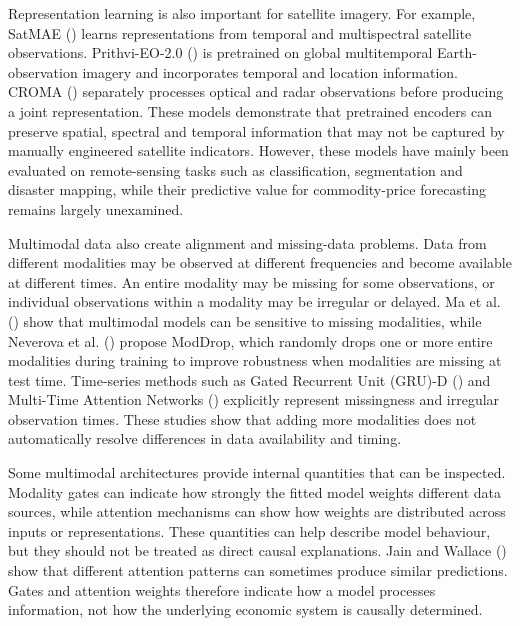 \documentclass[
  british,
  12pt,
  oneside]{book}
\begin{document}
Representation learning is also important for satellite imagery. For example, SatMAE () learns representations from temporal and multispectral satellite observations. Prithvi-EO-2.0 () is pretrained on global multitemporal Earth-observation imagery and incorporates temporal and location information. CROMA () separately processes optical and radar observations before producing a joint representation. These models demonstrate that pretrained encoders can preserve spatial, spectral and temporal information that may not be captured by manually engineered satellite indicators. However, these models have mainly been evaluated on remote-sensing tasks such as classification, segmentation and disaster mapping, while their predictive value for commodity-price forecasting remains largely unexamined.

Multimodal data also create alignment and missing-data problems. Data from different modalities may be observed at different frequencies and become available at different times. An entire modality may be missing for some observations, or individual observations within a modality may be irregular or delayed. Ma et al. () show that multimodal models can be sensitive to missing modalities, while Neverova et al. () propose ModDrop, which randomly drops one or more entire modalities during training to improve robustness when modalities are missing at test time. Time-series methods such as Gated Recurrent Unit (GRU)-D () and Multi-Time Attention Networks () explicitly represent missingness and irregular observation times. These studies show that adding more modalities does not automatically resolve differences in data availability and timing.

Some multimodal architectures provide internal quantities that can be inspected. Modality gates can indicate how strongly the fitted model weights different data sources, while attention mechanisms can show how weights are distributed across inputs or representations. These quantities can help describe model behaviour, but they should not be treated as direct causal explanations. Jain and Wallace () show that different attention patterns can sometimes produce similar predictions. Gates and attention weights therefore indicate how a model processes information, not how the underlying economic system is causally determined.
\end{document}
